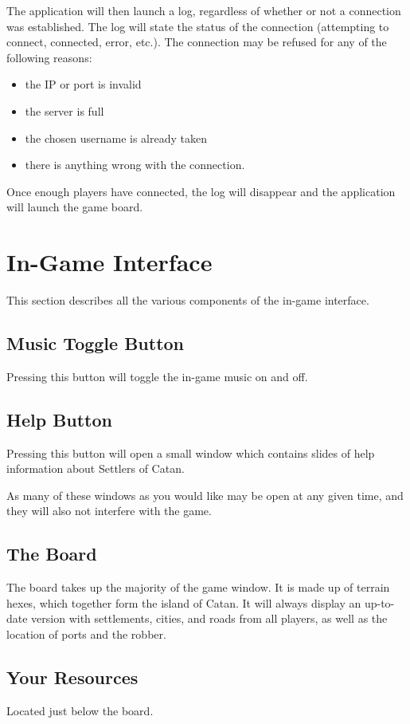 \documentclass[12pt,letterpaper,titlepage]{article}
\begin{document}
The application will then launch a log, regardless of whether or not a connection was established. The log will state the status of the connection (attempting to connect, connected, error, etc.). The connection may be refused for any of the following reasons:
\begin{itemize}
	\item the IP or port is invalid
	\item the server is full
	\item the chosen username is already taken
	\item there is anything wrong with the connection.
\end{itemize}
Once enough players have connected, the log will disappear and the application will launch the game board.

\section{In-Game Interface}
This section describes all the various components of the in-game interface.
	\subsection{Music Toggle Button}
	Pressing this button will toggle the in-game music on and off.
	
	\subsection{Help Button}
	Pressing this button will open a small window which contains slides of help information about Settlers of Catan.
	
	As many of these windows as you would like may be open at any given time, and they will also not interfere with the game.
	
	\subsection{The Board}
	The board takes up the majority of the game window. It is made up of terrain hexes, which together form the island of Catan. It will always display an up-to-date version with settlements, cities, and roads from all players, as well as the location of ports and the robber.
	
	\subsection{Your Resources}
	Located just below the board.
	
\end{document}
